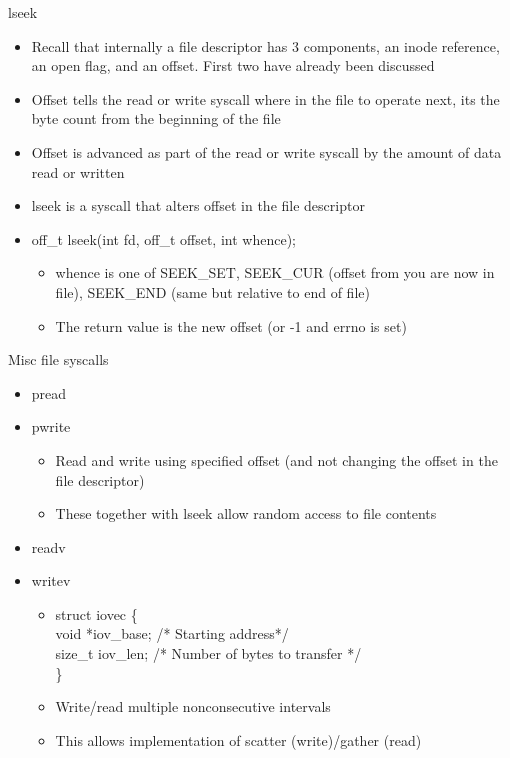lseek
\begin{itemize}
    \item Recall that internally a file descriptor has 3 components, an inode reference, an open flag, and an offset. First two have already been discussed
    \item Offset tells the read or write syscall where in the file to operate next, its the byte count from the beginning of the file
    \item Offset is advanced as part of the read or write syscall by the amount of data read or written
    \item lseek is a syscall that alters offset in the file descriptor
    \item off\_t lseek(int fd, off\_t offset, int whence);
    \begin{itemize}
        \item whence is one of SEEK\_SET, SEEK\_CUR (offset from you are now in file), SEEK\_END (same but relative to end of file)
        \item The return value is the new offset (or -1 and errno is set)
    \end{itemize}
\end{itemize}
Misc file syscalls
\begin{itemize}
    \item pread
    \item pwrite
    \begin{itemize}
        \item Read and write using specified offset (and not changing the offset in the file descriptor)
        \item These together with lseek allow random access to file contents
    \end{itemize}
    \item readv
    \item writev
    \begin{itemize}
        \item struct iovec \{ \\void *iov\_base; /* Starting address*/\\size\_t iov\_len; /* Number of bytes to transfer */ \\\}
        \item Write/read multiple nonconsecutive intervals
        \item This allows implementation of scatter (write)/gather (read)
    \end{itemize}
\end{itemize}
